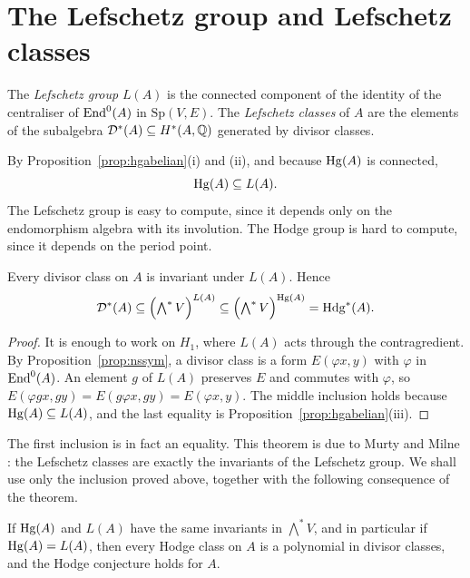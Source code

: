 \section{The Lefschetz group and Lefschetz classes}

\begin{definition}
The \emph{Lefschetz group} $L(A)$ is the connected component of the
identity of the centraliser of $\operatorname{End}^{0}(A)$ in $\mathrm{Sp}(V,E)$. The
\emph{Lefschetz classes} of $A$ are the elements of the subalgebra
$\mathcal D^{*}(A)\subseteq H^{*}(A,\mathbb{Q})$ generated by divisor classes.
\end{definition}

By Proposition~\ref{prop:hgabelian}(i) and (ii), and because $\operatorname{Hg}(A)$ is
connected,
\[
  \operatorname{Hg}(A)\subseteq L(A).
\]
The Lefschetz group is easy to compute, since it depends only on the
endomorphism algebra with its involution. The Hodge group is hard to
compute, since it depends on the period point.

\begin{proposition}\label{prop:lefinv}
Every divisor class on $A$ is invariant under $L(A)$. Hence
\[
  \mathcal D^{*}(A)\subseteq\Bigl(\textstyle\bigwedge^{*}V\Bigr)^{L(A)}
  \subseteq\Bigl(\textstyle\bigwedge^{*}V\Bigr)^{\operatorname{Hg}(A)}=\operatorname{Hdg}^{*}(A).
\]
\end{proposition}

\begin{proof}
It is enough to work on $H_{1}$, where $L(A)$ acts through the
contragredient. By Proposition~\ref{prop:nssym}, a divisor class is a form
$E(\varphi x,y)$ with $\varphi$ in $\operatorname{End}^{0}(A)$. An element $g$ of $L(A)$
preserves $E$ and commutes with $\varphi$, so
$E(\varphi gx,gy)=E(g\varphi x,gy)=E(\varphi x,y)$. The middle inclusion
holds because $\operatorname{Hg}(A)\subseteq L(A)$, and the last equality is
Proposition~\ref{prop:hgabelian}(iii).
\end{proof}

The first inclusion is in fact an equality. This theorem is due to Murty
and Milne \cite{Mur84,Mil99}: the Lefschetz classes are exactly the
invariants of the Lefschetz group. We shall use only the inclusion proved
above, together with the following consequence of the theorem.

\begin{corollary}\label{cor:hgeqlef}
If $\operatorname{Hg}(A)$ and $L(A)$ have the same invariants in $\bigwedge^{*}V$, and in
particular if $\operatorname{Hg}(A)=L(A)$, then every Hodge class on $A$ is a polynomial
in divisor classes, and the Hodge conjecture holds for $A$.
\end{corollary}

